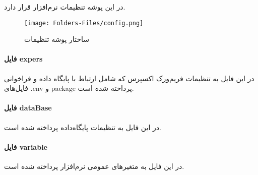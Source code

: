 در این پوشه تنظیمات نرم‌افزار قرار دارد. 

\begin{figure}[H]
	\texttt{[image: Folders-Files/config.png]}
	\centering
	\caption{ساختار پوشه تنظیمات}
	\label{fig:folder-config}
\end{figure}

\paragraph{فایل expers}
در این فایل به تنظیمات فریم‌ورک اکسپرس که شامل ارتباط با پایگاه داده و فراخوانی فایل‌های .env و package پرداخته شده است. 

\paragraph{فایل dataBase}
در این فایل به تنظیمات پایگاه‌داده پرداخته شده است. 

\paragraph{فایل variable}
در این فایل به متغیرهای عمومی نرم‌افزار پرداخته شده است. 
